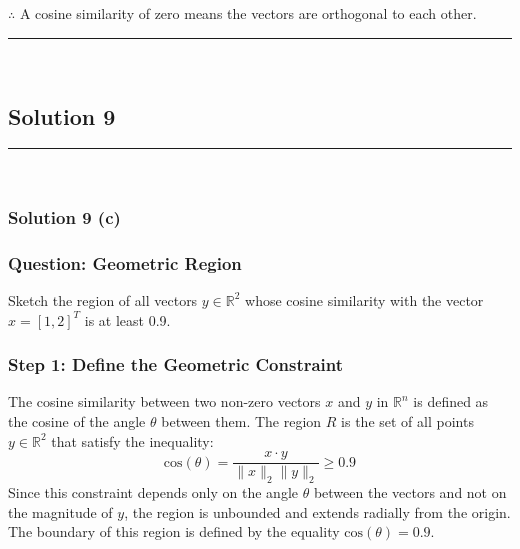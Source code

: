 \documentclass{article}
\begin{document}
\subsubsection*{\normalfont}{$\therefore$ A cosine similarity of zero means the vectors are orthogonal to each other.}

\noindent\rule{\textwidth}{0.4pt}\\

\newpage
\subsection*{Solution 9}
\noindent\rule{\textwidth}{0.4pt}\\
\subsubsection*{Solution 9 (c)}

\subsubsection*{Question: Geometric Region}
Sketch the region of all vectors $y \in \mathbb{R}^2$ whose cosine similarity with the vector $x = [1, 2]^T$ is at least 0.9.

\subsubsection*{Step 1: Define the Geometric Constraint}
\parbox{\textwidth}{
The cosine similarity between two non-zero vectors $x$ and $y$ in $\mathbb{R}^n$ is defined as the cosine of the angle $\theta$ between them. The region $R$ is the set of all points $y \in \mathbb{R}^2$ that satisfy the inequality:
$$ \text{cos}(\theta) = \frac{x \cdot y}{\|x\|_2 \|y\|_2} \geq 0.9 $$
Since this constraint depends only on the angle $\theta$ between the vectors and not on the magnitude of $y$, the region is unbounded and extends radially from the origin. The boundary of this region is defined by the equality $\text{cos}(\theta) = 0.9$.
}
\end{document}

